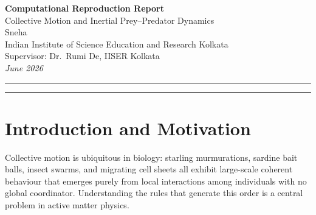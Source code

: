 \documentclass[11pt,a4paper]{article}
\begin{document}
\begin{center}
  {\LARGE\bfseries Computational Reproduction Report}\\[6pt]
  {\large Collective Motion and Inertial Prey--Predator Dynamics}\\[10pt]
  {\normalsize
    Sneha\\
    Indian Institute of Science Education and Research Kolkata\\[4pt]
    Supervisor: Dr.\ Rumi De, IISER Kolkata\\[6pt]
    \textit{June 2026}
  }
\end{center}

\vspace{4pt}
\hrule
\vspace{10pt}

\begin{abstract}
\noindent
This report presents a computational reproduction of two theoretical studies
on collective animal motion and prey--predator dynamics from the group of
Dr.\ Rumi De at IISER Kolkata. The first paper (De and Chakraborty, 2022)
reviews self-propelled particle models for collective motion in fish schools,
bird flocks, and prey swarms. The second (Chakraborty, Laha, and De, 2022)
introduces inertial forces into the prey--predator model and identifies an
optimal predator-to-prey mass ratio governing the arms race between pursuit
and evasion. All simulations are implemented in Julia (physics kernels) with
Python (NumPy/Matplotlib) for figure generation. Key results reproduced
include the Vicsek disorder-to-order phase transition, the metric versus
topological flocking crossover, the interaction-range dependence of prey
survival, and three distinct survival regimes as a function of predator mass.
\end{abstract}

\vspace{6pt}
\hrule
\vspace{10pt}

\section{Introduction and Motivation}

Collective motion is ubiquitous in biology: starling murmurations,
sardine bait balls, insect swarms, and migrating cell sheets all exhibit
large-scale coherent behaviour that emerges purely from local interactions
among individuals with no global coordinator. Understanding the rules that
generate this order is a central problem in active matter physics.
\end{document}
